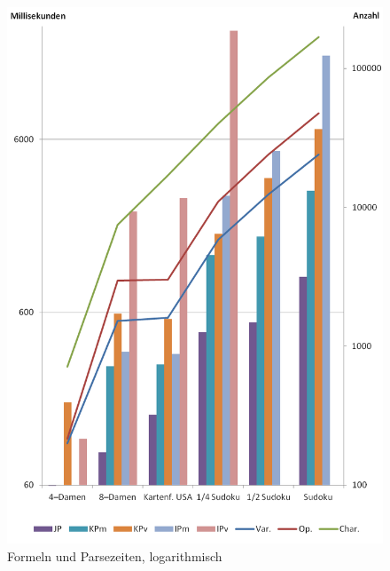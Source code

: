 \documentclass[ngerman,a4paper,abstracton,open=right,twoside=false,toc=listofnumbered,bibtotocnumbered]{scrreprt}
\begin{document}
\begin{figure}[!ht]
	\begin{center}
		\includegraphics[scale=0.85]{img/log10}
	\end{center}
	\caption{\label{parse-log}Formeln und Parsezeiten, logarithmisch}
\end{figure}
\end{document}
